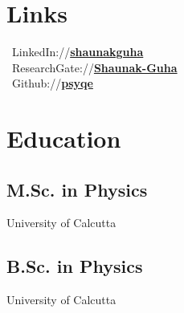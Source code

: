 \documentclass[]{psyqe-resume-openfont}
\begin{document}
\begin{minipage}[t]{0.34\textwidth} 

\section{Links} 
 \ LinkedIn://\href{https://www.linkedin.com/in/shaunakguha}{\bf shaunakguha} \\
 \ ResearchGate://\href{https://www.researchgate.net/profile/Shaunak-Guha}{\bf Shaunak-Guha} \\
 \ Github://\href{https://github.com/psyqe}{\bf psyqe} \\
\vspace{-3pt}

\section{Education} 
\subsection{M.Sc. in Physics}
University of Calcutta \\
\vspace{4pt}
\sectionsep

\subsection{B.Sc. in Physics }
University of Calcutta \\
\vspace{4pt}
\sectionsep


\end{minipage}
\end{document}
